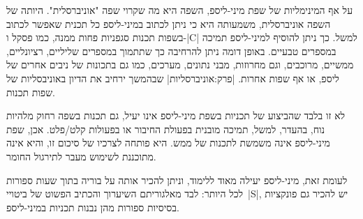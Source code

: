 על אף המינימליות של שפת מיני-ליספ, השפה היא מה שקרוי שפה "אוניברסלית". היותה של
השפה אוניברסלית, משמעותה היא כי ניתן לכתוב במיני-ליספ כל תכנית שאפשר לכתוב
בשפות תכנות סגפניות פחות ממנה, כמו פסקל ו-\E|C| למשל. כך ניתן להוסיף למיני-ליספ
תמיכה במספרים טבעיים. באופן דומה ניתן להרחיבה כך שתתמוך במספרים שליליים,
רציונליים, ממשיים, מרוכבים, וגם מחרוזות, מבני נתונים, מערכים, כמו גם בתכונות של
ניבים אחרים של ליספ, או אף שפות אחרות. |פרק:אוניברסליות| שבהמשך ירחיב את
הדיון באוניבסליות של שפות תכנות.

לא זו בלבד שהביצוע של תכניות בשפת מיני-ליספ אינו יעיל, גם תכנות בשפה רחוק
מלהיות נוח, בהעדר, למשל, תמיכה מובנית בפעולת החיבור או בפעולות קלט/פלט. אכן,
שפת מיני-ליספ אינה משמשת לתכנות של ממש. היא פותחה לצרכיו של סיכום זו, והיא אינה
מתוכננת לשימוש מעבר לתירגול החומר.

לעומת זאת, מיני-ליספ יעילה מאוד ללימוד, וניתן להכיר אותה על בוריה בתוך שעות
ספורות לכל היותר: לבד מאלגוריתם השיערוך והכתיב הפשוט של ביטויי~\E|S|, יש להכיר
גם פונקציות בסיסיות ספורות מהן נבנות תכניות במיני-ליספ.

